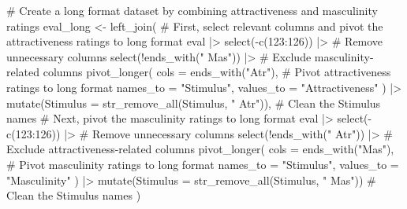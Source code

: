 \documentclass[
  bookmarksnumbered]{article}
\newenvironment{Shaded}{\begin{snugshade}}{\end{snugshade}}
\newcommand{\AttributeTok}[1]{\textcolor[rgb]{0.80,0.80,0.80}{#1}}
\newcommand{\CommentTok}[1]{\textcolor[rgb]{0.50,0.62,0.50}{#1}}
\newcommand{\DecValTok}[1]{\textcolor[rgb]{0.86,0.86,0.80}{#1}}
\newcommand{\FunctionTok}[1]{\textcolor[rgb]{0.94,0.94,0.56}{#1}}
\newcommand{\NormalTok}[1]{\textcolor[rgb]{0.80,0.80,0.80}{#1}}
\newcommand{\OtherTok}[1]{\textcolor[rgb]{0.94,0.94,0.56}{#1}}
\newcommand{\SpecialCharTok}[1]{\textcolor[rgb]{0.86,0.64,0.64}{#1}}
\newcommand{\StringTok}[1]{\textcolor[rgb]{0.80,0.58,0.58}{#1}}
\begin{document}
\begin{Shaded}
\begin{Highlighting}[]
\CommentTok{\# Create a long format dataset by combining attractiveness and masculinity ratings}
\NormalTok{eval\_long }\OtherTok{\textless{}{-}} \FunctionTok{left\_join}\NormalTok{(}
  \CommentTok{\# First, select relevant columns and pivot the attractiveness ratings to long format}
\NormalTok{  eval }\SpecialCharTok{|\textgreater{}}
    \FunctionTok{select}\NormalTok{(}\SpecialCharTok{{-}}\FunctionTok{c}\NormalTok{(}\DecValTok{123}\SpecialCharTok{:}\DecValTok{126}\NormalTok{)) }\SpecialCharTok{|\textgreater{}} \CommentTok{\# Remove unnecessary columns}
    \FunctionTok{select}\NormalTok{(}\SpecialCharTok{!}\FunctionTok{ends\_with}\NormalTok{(}\StringTok{" Mas"}\NormalTok{)) }\SpecialCharTok{|\textgreater{}} \CommentTok{\# Exclude masculinity{-}related columns}
    \FunctionTok{pivot\_longer}\NormalTok{(}
      \AttributeTok{cols =} \FunctionTok{ends\_with}\NormalTok{(}\StringTok{"Atr"}\NormalTok{), }\CommentTok{\# Pivot attractiveness ratings to long format}
      \AttributeTok{names\_to =} \StringTok{"Stimulus"}\NormalTok{,}
      \AttributeTok{values\_to =} \StringTok{"Attractiveness"}
\NormalTok{    ) }\SpecialCharTok{|\textgreater{}}
    \FunctionTok{mutate}\NormalTok{(}\AttributeTok{Stimulus =} \FunctionTok{str\_remove\_all}\NormalTok{(Stimulus, }\StringTok{" Atr"}\NormalTok{)), }\CommentTok{\# Clean the Stimulus names}
  \CommentTok{\# Next, pivot the masculinity ratings to long format}
\NormalTok{  eval }\SpecialCharTok{|\textgreater{}}
    \FunctionTok{select}\NormalTok{(}\SpecialCharTok{{-}}\FunctionTok{c}\NormalTok{(}\DecValTok{123}\SpecialCharTok{:}\DecValTok{126}\NormalTok{)) }\SpecialCharTok{|\textgreater{}} \CommentTok{\# Remove unnecessary columns}
    \FunctionTok{select}\NormalTok{(}\SpecialCharTok{!}\FunctionTok{ends\_with}\NormalTok{(}\StringTok{" Atr"}\NormalTok{)) }\SpecialCharTok{|\textgreater{}} \CommentTok{\# Exclude attractiveness{-}related columns}
    \FunctionTok{pivot\_longer}\NormalTok{(}
      \AttributeTok{cols =} \FunctionTok{ends\_with}\NormalTok{(}\StringTok{"Mas"}\NormalTok{), }\CommentTok{\# Pivot masculinity ratings to long format}
      \AttributeTok{names\_to =} \StringTok{"Stimulus"}\NormalTok{,}
      \AttributeTok{values\_to =} \StringTok{"Masculinity"}
\NormalTok{    ) }\SpecialCharTok{|\textgreater{}}
    \FunctionTok{mutate}\NormalTok{(}\AttributeTok{Stimulus =} \FunctionTok{str\_remove\_all}\NormalTok{(Stimulus, }\StringTok{" Mas"}\NormalTok{)) }\CommentTok{\# Clean the Stimulus names}
\NormalTok{)}
\end{Highlighting}
\end{Shaded}
\end{document}
